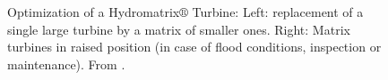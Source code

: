 \begin{figure}[h!]
\begin{minipage}[b]{0.5\linewidth}
 \centering
\end{minipage}
\begin{minipage}[b]{0.5\linewidth}
 \centering
\end{minipage}
\caption{Optimization of a Hydromatrix$\circledR$ Turbine: Left: replacement of a single large turbine by a matrix of smaller ones. Right: Matrix turbines in raised position (in case of flood conditions, inspection or maintenance). From \cite{matrix,matrix_2}.}
\label{Matrix_a}
\end{figure}

